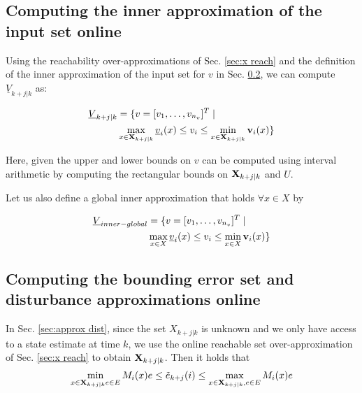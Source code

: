 \subsection{Computing the inner approximation of the input set online}

Using the reachability over-approximations of Sec. \ref{sec:x reach} and the definition of the inner approximation of the input set for $v$ in Sec. \ref{}, we can compute $\underline{V}_{k+j|k}$ as:

\begin{subequations}
\begin{align}
\underline{V}_{k+j|k} &= \{v=[v_1,\ldots,v_{n_v}]^T \;|\; \nonumber \\
&\max_{x\in \mathbf{X}_{k+j|k}} \underline{v}_i(x)  \leq v_i \leq \min_{x \in \mathbf{X}_{k+j|k}} \mathbf{v}_i(x) \} 
\end{align}
\end{subequations}

Here, given the upper and lower bounds on $v$ can be computed using interval arithmetic by computing the rectangular bounds on $\mathbf{X}_{k+j|k}$ and $U$. 

Let us also define a global inner approximation that holds $\forall x \in X$ by 

\begin{subequations}
\begin{align}
\underline{V}_{inner-global} &= \{v=[v_1,\ldots,v_{n_v}]^T \;|\; \nonumber \\
&\max_{x\in X} \underline{v}_i(x)  \leq v_i \leq \min_{x \in X} \mathbf{v}_i(x) \} 
\end{align}
\end{subequations}


\subsection{Computing the bounding error set and disturbance approximations online}

In Sec. \ref{sec:approx dist}, since the set $X_{k+j|k}$ is unknown and we only have access to a state estimate at time $k$, we use the online reachable set over-approximation of Sec. \ref{sec:x reach} to obtain $\mathbf{X}_{k+j|k}$.
Then it holds that 
\[\min_{x \in \mathbf{X}_{k+j|k} e \in E}M_i(x)e \leq \tilde{e}_{k+j}(i) \leq \max_{x \in \mathbf{X}_{k+j|k}, e \in E} M_i(x)e\]

